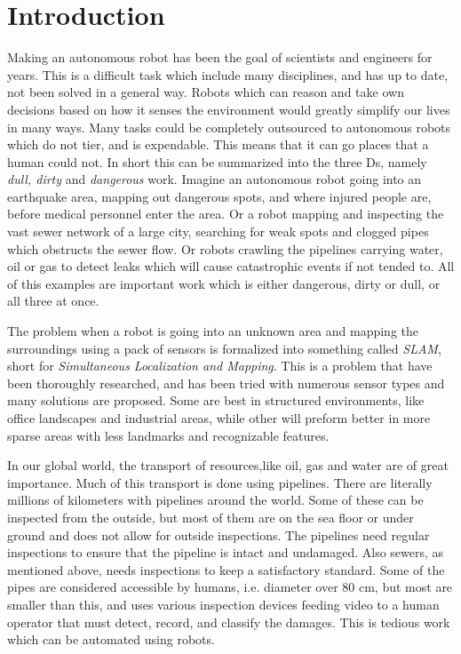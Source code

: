 
\chapter{Introduction}
Making an autonomous robot has been the goal of scientists and engineers for years. This
is a difficult task which include many disciplines, and has up to date, not been solved in
a general way. Robots which can reason and take own decisions based on how it senses the
environment would greatly simplify our lives in many ways. Many tasks could be completely
outsourced to autonomous robots which do not tier, and is expendable. This means that it
can go places that a human could not. In short this can be summarized into the three Ds,
namely \emph{dull, dirty} and \emph{dangerous} work. Imagine an autonomous robot going
into an earthquake area, mapping out dangerous spots, and where injured people are,
before medical personnel enter the area. Or a robot mapping and inspecting the vast sewer
network of a large city, searching for weak spots and clogged pipes which obstructs the
sewer flow. Or robots crawling the pipelines carrying water, oil or gas to detect leaks
which will cause catastrophic events if not tended to. All of this examples are important work which
is either dangerous, dirty or dull, or all three at once.

The problem when a robot is going into an unknown area and mapping the surroundings using
a pack of sensors is formalized into something called \emph{SLAM}, short for
\emph{Simultaneous Localization and Mapping}.
This is a problem that have been thoroughly researched, and has been tried with numerous sensor types
and many solutions are proposed. Some are best in structured environments, like office
landscapes and industrial areas, while other will preform better in more sparse areas with
less landmarks and recognizable features. 

In our global world, the transport of resources,like oil, gas and water are of great importance. Much of this
transport is done using pipelines. There are literally millions of kilometers with pipelines around
the world. Some of these can be inspected from the outside, but most of them are on the
sea floor or under ground and does not allow for outside inspections. 
The pipelines need regular inspections to ensure that the pipeline is intact
and undamaged. Also sewers, as mentioned above, needs inspections to keep a satisfactory
standard. Some of the pipes are considered accessible by humans, i.e. diameter over 80 cm,
but most are smaller than this, and uses various inspection devices feeding video to a human
operator that must detect, record, and classify the damages. This is tedious work which
can be automated using robots. \cite{MAKRO-project}

